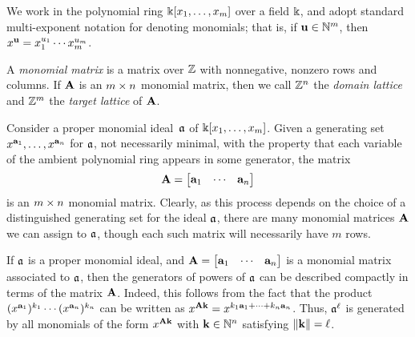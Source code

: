 \documentclass{amsart}
\begin{document}
We work in the polynomial ring $\Bbbk[x_1, \ldots, x_m]$ over a field $\Bbbk$, and adopt standard multi-exponent notation for denoting monomials; that is, if $\mathbf{u} \in \mathbb{N}^m$, then $x^{\mathbf{u}} = x_1^{u_1} \cdots x_m^{u_m}$.

\begin{definition}
\label{monomial matrix: D}
A \emph{monomial matrix} is a matrix over $\mathbb{Z}$ with nonnegative, nonzero rows and columns.
If $\mathbf{A}$ is an $m \times n$ monomial matrix, then we call $\mathbb{Z}^n$ the \emph{domain lattice} and $\mathbb{Z}^m$ the \emph{target lattice} of $\mathbf{A}$.
\end{definition}

\begin{remark}
   \label{monomial matrix ideal: R}
   Consider a proper monomial ideal~$\mathfrak{a}$ of $\Bbbk[x_1, \ldots, x_{m}]$.
   Given a generating set $x^{\mathbf{a}_1}, \ldots, x^{\mathbf{a}_n}$ for $\mathfrak{a}$, not necessarily minimal, with the property that each variable of the ambient polynomial ring appears in some generator, the matrix
   \[
      \mathbf{A}= \begin{bmatrix} \mathbf{a}_1 & \cdots & \mathbf{a}_n \end{bmatrix}
   \]
   is an  $m \times n$ monomial matrix.
   Clearly, as this process depends on the choice of a distinguished generating set for the ideal $\mathfrak{a}$, there are many monomial matrices $\mathbf{A}$ we can assign to $\mathfrak{a}$, though each such matrix will necessarily have $m$ rows.
\end{remark}

\begin{remark}
   \label{generators-via-exponent-matrix: R}
   If $\mathfrak{a}$ is a proper monomial ideal, and $\mathbf{A}= \begin{bmatrix} \mathbf{a}_1 & \cdots & \mathbf{a}_n \end{bmatrix}$ is a monomial matrix associated to $\mathfrak{a}$, then the generators of powers of $\mathfrak{a}$ can be described compactly in terms of the matrix $\mathbf{A}$.
   Indeed, this follows from the fact that the product $(x^{\mathbf{a}_1})^{k_1} \cdots (x^{\mathbf{a}_n})^{k_n}$ can be written as $x^{\mathbf{A} \mathbf{k}} = x^{k_1 \mathbf{a}_1 + \cdots + k_n \mathbf{a}_n}$.
   Thus, $\mathfrak{a}^\ell$ is generated by all monomials of the form $x^{\mathbf{A} \mathbf{k}}$ with $\mathbf{k} \in \mathbb{N}^n$ satisfying $\| \mathbf{k} \| = \ell$.
\end{remark}
\end{document}
